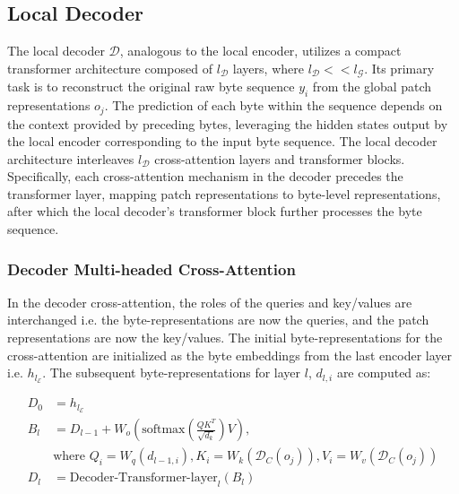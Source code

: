 \subsection{Local Decoder} 

The local decoder $\mathcal{D}$, analogous to the local encoder, utilizes a compact transformer architecture composed of $l_{\mathcal{D}}$ layers, where $l_{\mathcal{D}} << l_{\mathcal{G}}$. Its primary task is to reconstruct the original raw byte sequence $y_i$ from the global patch representations $o_j$. The prediction of each byte within the sequence depends on the context provided by preceding bytes, leveraging the hidden states output by the local encoder corresponding to the input byte sequence. The local decoder architecture interleaves $l_{\mathcal{D}}$ cross-attention layers and transformer blocks. Specifically, each cross-attention mechanism in the decoder precedes the transformer layer, mapping patch representations to byte-level representations, after which the local decoder's transformer block further processes the byte sequence.

\subsubsection{Decoder Multi-headed Cross-Attention} 

In the decoder cross-attention, the roles of the queries and key/values are interchanged i.e. the byte-representations are now the queries, and the patch representations are now the key/values. The initial byte-representations for the cross-attention are initialized as the byte embeddings from the last encoder layer i.e. $h_{l_{\mathcal{E}}}$. The subsequent byte-representations for layer $l$, $d_{l,i}$ are computed as:

\begin{align}
D_0 &= h_{l_{\mathcal{E}}} \\
B_l &= D_{l-1} + W_o\left(\text{softmax}\left(\frac{QK^T}{\sqrt{d_k}}\right)V\right), \\
  &\text{where } Q_i = W_q(d_{l-1,i}), K_i = W_k(\mathcal{D}_C(o_j)), V_i = W_v(\mathcal{D}_C(o_j)) \\
  D_l &= \text{Decoder-Transformer-layer}_l(B_l)
\end{align}


